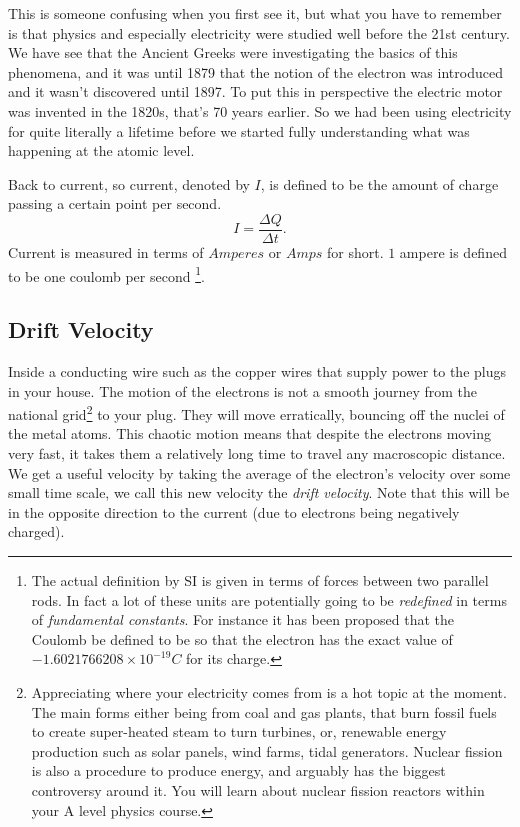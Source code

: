 \documentclass[12pt]{article}
\begin{document}
This is someone confusing when you first see it, but what you have to
remember is that physics and especially electricity were studied well
before the 21st century. We have see that the Ancient Greeks were
investigating the basics of this phenomena, and it was until 1879 that
the notion of the electron was introduced and it wasn't discovered until 1897. To put this in perspective the electric motor was invented in the 1820s, that's 70 years earlier. So we had been using electricity for quite literally a lifetime before we started
fully understanding what was happening at the atomic level.

Back to current, so current, denoted by \(I\), is defined to be the
amount of charge passing a certain point per second.
\[I = \frac{\Delta Q}{ \Delta t}.\]
Current is measured in terms of \(Amperes\) or \(Amps\) for short. \(1\) ampere is defined to be one coulomb per second \footnote{The actual definition by SI is given in terms of forces between two parallel rods. In fact a lot of these units are potentially going to be \emph{redefined} in terms of \emph{fundamental constants}. For instance it has been proposed that the Coulomb be defined to be so that the electron has the exact value of \(-1.6021766208 \times 10^{-19}C\) for its charge.}.


\subsection{Drift Velocity}\label{drift-velocity}

Inside a conducting wire such as the copper wires that supply power to the plugs in your house. The motion of the electrons is not a smooth journey from the national grid\footnote{Appreciating where your electricity comes from is a hot topic at the moment. The main forms either being from coal and gas plants, that burn fossil fuels to create super-heated steam to turn turbines, or, renewable energy production such as solar panels, wind farms, tidal generators. Nuclear fission is also a procedure to produce energy, and arguably has the biggest controversy around it. You will learn about nuclear fission reactors within your A level physics course.} to your plug. They will move erratically, bouncing off the nuclei of the metal atoms. This chaotic motion means that despite the electrons moving very fast, it takes them a relatively long time to travel any macroscopic distance. We get a useful velocity by taking the average of the electron's velocity over some small time scale, we call this new velocity the \emph{drift velocity}. Note that this will be in the opposite direction to the current (due to electrons being negatively charged). 
\end{document}
